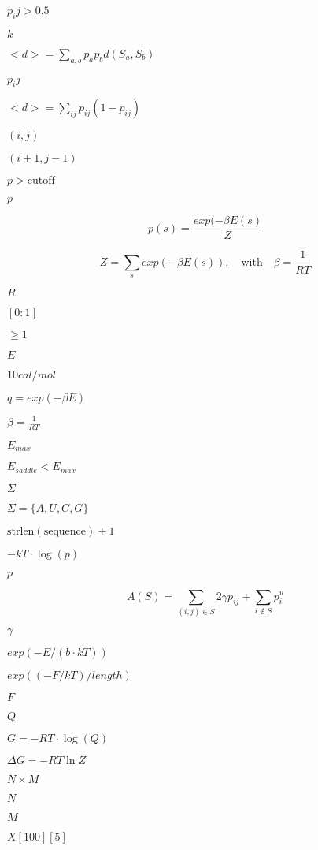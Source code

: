 \documentclass{article}
\begin{document}
$p_ij>0.5$
\pagebreak

$k$
\pagebreak

$<d> = \sum_{a,b} p_a p_b d(S_a,S_b)$
\pagebreak

$p_ij$
\pagebreak

$<d> = \sum_{ij} p_{ij}(1-p_{ij})$
\pagebreak

$(i,j)$
\pagebreak

$(i+1, j-1)$
\pagebreak

$ p > \textrm{cutoff} $
\pagebreak

$ p $
\pagebreak

\[ p(s) = \frac{exp(-\beta E(s)}{Z} \]
\pagebreak

\[ Z = \sum_s exp(-\beta E(s)),\quad\mathrm{with}\quad\beta = \frac{1}{RT} \]
\pagebreak

$R$
\pagebreak

$[0:1]$
\pagebreak

$ \ge 1 $
\pagebreak

$E$
\pagebreak

$10 cal/mol$
\pagebreak

$q = exp(-\beta E)$
\pagebreak

$\beta = \frac{1}{RT}$
\pagebreak

$E_{max}$
\pagebreak

$E_{saddle} < E_{max}$
\pagebreak

$\Sigma$
\pagebreak

$ \Sigma = \{A,U,C,G\} $
\pagebreak

$\mathrm{strlen}(\mathrm{sequence})+1$
\pagebreak

$-kT \cdot \log(p)$
\pagebreak

$p$
\pagebreak

\[ A(S) = \sum_{(i,j) \in S} 2 \gamma p_{ij} + \sum_{i \notin S} p^u_i \]
\pagebreak

$\gamma$
\pagebreak

$ exp(-E / (b \cdot kT))$
\pagebreak

$exp{((-F/kT)/length)}$
\pagebreak

$F$
\pagebreak

$Q$
\pagebreak

$G = -RT \cdot \log(Q) $
\pagebreak

$\Delta G = - RT \ln Z$
\pagebreak

$ N \times M $
\pagebreak

$N$
\pagebreak

$M$
\pagebreak

$X[100][5]$
\pagebreak
\end{document}
